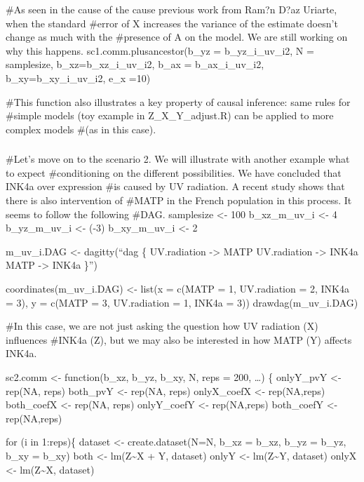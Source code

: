 \documentclass[
]{article}
\begin{document}
\#As seen in the cause of the cause previous work from Ram?n D?az
Uriarte, when the standard \#error of X increases the variance of the
estimate doesn't change as much with the \#presence of A on the model.
We are still working on why this happens. sc1.comm.plusancestor(b\_yz =
b\_yz\_i\_uv\_i2, N = samplesize, b\_xz=b\_xz\_i\_uv\_i2, b\_ax =
b\_ax\_i\_uv\_i2, b\_xy=b\_xy\_i\_uv\_i2, e\_x =10)

\#This function also illustrates a key property of causal inference:
same rules for \#simple models (toy example in Z\_X\_Y\_adjust.R) can be
applied to more complex models \#(as in this case).

\hypertarget{section}{%
\subsubsection{}\label{section}}

\#Let's move on to the scenario 2. We will illustrate with another
example what to expect \#conditioning on the different possibilities. We
have concluded that INK4a over expression \#is caused by UV radiation. A
recent study shows that there is also intervention of \#MATP in the
French population in this process. It seems to follow the following
\#DAG. samplesize \textless- 100 b\_xz\_m\_uv\_i \textless- 4
b\_yz\_m\_uv\_i \textless- (-3) b\_xy\_m\_uv\_i \textless- 2

m\_uv\_i.DAG \textless- dagitty(``dag \{ UV.radiation -\textgreater{}
MATP UV.radiation -\textgreater{} INK4a MATP -\textgreater{} INK4a \}'')

coordinates(m\_uv\_i.DAG) \textless- list(x = c(MATP = 1, UV.radiation =
2, INK4a = 3), y = c(MATP = 3, UV.radiation = 1, INK4a = 3))
drawdag(m\_uv\_i.DAG)

\#In this case, we are not just asking the question how UV radiation (X)
influences \#INK4a (Z), but we may also be interested in how MATP (Y)
affects INK4a.

sc2.comm \textless- function(b\_xz, b\_yz, b\_xy, N, reps = 200, \ldots)
\{ onlyY\_pvY \textless- rep(NA, reps) both\_pvY \textless- rep(NA,
reps) onlyX\_coefX \textless- rep(NA,reps) both\_coefX \textless-
rep(NA, reps) onlyY\_coefY \textless- rep(NA,reps) both\_coefY
\textless- rep(NA,reps)

for (i in 1:reps)\{ dataset \textless- create.dataset(N=N, b\_xz =
b\_xz, b\_yz = b\_yz, b\_xy = b\_xy) both \textless-
lm(Z\textasciitilde X + Y, dataset) onlyY \textless-
lm(Z\textasciitilde Y, dataset) onlyX \textless- lm(Z\textasciitilde X,
dataset)
\end{document}
